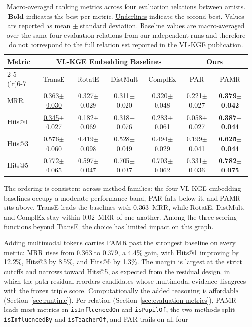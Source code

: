 \documentclass[runningheads]{llncs}
\begin{document}
\begin{table}[t]
  \centering
  \setlength{\tabcolsep}{2pt}
  \renewcommand{\arraystretch}{1.15}
  {\scriptsize
    \begin{tabular}{l|cccc|cc}
      \toprule
      \multirow{2}{*}{Metric} &
      \multicolumn{4}{|c|}{VL-KGE Embedding Baselines} &
      \multicolumn{2}{|c|}{Ours} \\
      \cmidrule(lr){2-5} \cmidrule(lr){6-7}
      & TransE & RotatE & DistMult & ComplEx & PAR & PAMR \\
      \midrule
      MRR  & \underline{0.363$\pm$0.030} & 0.327$\pm$0.029 & 0.311$\pm$0.020 & 0.320$\pm$0.048 & 0.221$\pm$0.027 & \textbf{0.379$\pm$0.042} \\
      Hits@1 & \underline{0.345$\pm$0.027} & 0.182$\pm$0.069 & 0.318$\pm$0.076 & 0.283$\pm$0.061 & 0.058$\pm$0.027 & \textbf{0.387$\pm$0.044} \\
      Hits@3 & \underline{0.576$\pm$0.060} & 0.419$\pm$0.098 & 0.528$\pm$0.049 & 0.494$\pm$0.029 & 0.199$\pm$0.041 & \textbf{0.625$\pm$0.044} \\
      Hits@5 & \underline{0.772$\pm$0.065} & 0.597$\pm$0.047 & 0.705$\pm$0.037 & 0.703$\pm$0.062 & 0.331$\pm$0.036 & \textbf{0.782$\pm$0.075} \\
      \bottomrule
  \end{tabular}}
  \caption{Macro-averaged ranking metrics across four evaluation
    relations between artists. \textbf{Bold} indicates the best per metric.
    \underline{Underlines} indicate the second best. Values are reported
    as mean $\pm$ standard deviation. Baseline values are macro-averaged
    over the same four evaluation relations from our independent runs
    and therefore do not correspond to the full relation set reported in
  the VL-KGE publication.}
  \label{tab:results}
\end{table}

The ordering is consistent across method families: the four VL-KGE
embedding baselines occupy a moderate performance band, PAR falls
below it, and PAMR sits above. TransE leads the baselines with
0.363~MRR, while RotatE, DistMult, and ComplEx stay within
0.02~MRR of one another. Among the three scoring functions beyond
TransE, the choice has limited impact on this graph.

Adding multimodal tokens carries PAMR past the strongest baseline on
every metric: MRR rises from 0.363 to 0.379, a 4.4\% gain, with
Hits@1 improving by 12.2\%, Hits@3 by 8.5\%, and Hits@5 by 1.3\%. The
margin is largest at the strict cutoffs and narrows
toward Hits@5, as expected from the residual design, in which the path
residual reorders candidates whose multimodal evidence disagrees with the
frozen triple score. Computationally the added reasoning is affordable
(Section~\ref{sec:runtime}). Per relation
(Section~\ref{sec:evaluation-metrics}), PAMR leads most metrics on
\texttt{isInfluencedOn} and \texttt{isPupilOf}, the two methods split
\texttt{isInfluencedBy} and \texttt{isTeacherOf}, and PAR trails on
all four.
\end{document}
